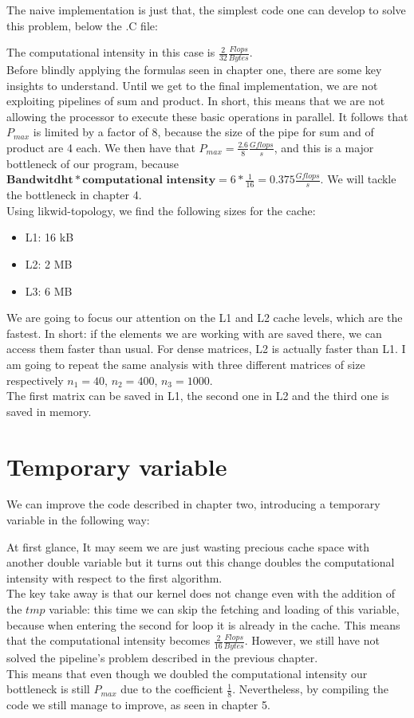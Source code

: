 \documentclass[11pt,a4paper,oneside,titlepage,openright]{book}
\begin{document}
The naive implementation is just that, the simplest code one can develop to solve this problem, below the .C file:

The computational intensity in this case is $\frac{2}{32}\frac{Flops}{Bytes}$. 
\\Before blindly applying the formulas seen in chapter one, there are some key insights to understand. Until we get to the final implementation, we are not exploiting pipelines of sum and product. In short, this means that we are not allowing the processor to execute these basic operations in parallel. It follows that $P_{max}$ is limited by a factor of $8$, because the size of the pipe for sum and of product are 4 each.
We then have that $P_{max}= \frac{2.6}{8} \frac{Gflops}{s} $, and this is a major bottleneck of our program, because $\textbf{Bandwitdht} * \textbf{computational intensity} = 6*\frac{1}{16} = 0.375 \frac{Gflops}{s} $. We will tackle the bottleneck in chapter 4.\\
Using likwid-topology, we find the following sizes for the cache: 
\begin{itemize}
\item L1: 16 kB
\item L2: 2 MB
\item L3: 6 MB
\end{itemize}
We are going to focus our attention on the L1 and L2 cache levels, which are the fastest. In short: if the elements we are working with are saved there, we can access them faster than usual.  For dense matrices, L2 is actually faster than L1. I am going to repeat the same analysis with three different matrices of size respectively $n_1 = 40$, $n_2 = 400$, $n_3 = 1000$.\\
The first matrix can be saved in L1, the second one in L2 and the third one is saved in memory.  


\chapter{Temporary variable}

We can improve the code described in chapter two, introducing a temporary variable in the following way: 

At first glance, It may seem we are just wasting precious cache space with another double variable but it turns out this change doubles the computational intensity with respect to the first algorithm. \\
The key take away is that our kernel does not change even with the addition of the $\textit{tmp}$ variable: this time we can skip the fetching and loading of this variable, because when entering the second for loop it is already in the cache. This means that the computational intensity becomes $\frac{2}{16}\frac{Flops}{Bytes}$. 
However, we still have not solved the pipeline's problem described in the previous chapter. \\
This means that even though we doubled the computational intensity our bottleneck is still $P_{max}$ due to the coefficient $\frac{1}{8}$.  
Nevertheless, by compiling the code we still manage to improve, as seen in chapter 5.
\end{document}
